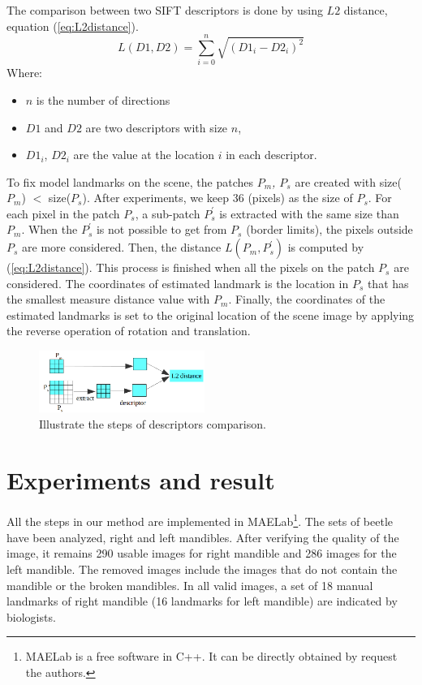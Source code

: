 \documentclass[twoside,twocolumn,10pt]{article}
\begin{document}
The comparison between two SIFT descriptors is done by using $L2$ distance, equation (\ref{eq:L2distance}).
\begin{equation}
\label{eq:L2distance}
	L(D1,D2) = \sum\limits_{i = 0}^{n}\sqrt{(D1_i-D2_i)^2}
\end{equation}
Where:
\begin{itemize}
	\item $n$ is the number of directions
	\item $D1$ and $D2$ are two descriptors with size $n$,
	\item  $D1_i$, $D2_i $ are the value at the location $i$ in each descriptor.
\end{itemize}
To fix model landmarks on the scene, the patches \textit{$P_m$, $P_s$} are created with size($P_m$) $<$ size($P_s$). After experiments, we keep 36 (pixels) as the size of \textit{$P_s$}. For each pixel in the patch \textit{$P_s$}, a sub-patch \textit{$P^{'}_s$} is extracted with the same size than \textit{$P_m$}. When the \textit{$P^{'}_s$} is not possible to get from \textit{$P_s$} (border limits), the pixels outside \textit{$P_s$} are more considered. Then, the distance \textit{$L(P_m,P^{'}_s)$} is computed by (\ref{eq:L2distance}). This process is finished when all the pixels on the patch \textit{$P_s$} are considered. The coordinates of estimated landmark is the location in \textit{$P_s$} that has the smallest measure distance value with \textit{$P_m$}. Finally, the coordinates of the estimated landmarks is set to the original location of the scene image by applying the reverse operation of rotation and translation.
\begin{figure}[htb]
    \centering
    \includegraphics[width=0.48\textwidth]{./images/illustration_SIFT}
    \caption{Illustrate the steps of descriptors comparison.}
    \label{fig:Illustrate}
\end{figure}
\section{Experiments and result}
All the steps in our method are implemented in MAELab\footnote{MAELab
  is a free software in C++. It can be directly obtained by request
  the authors.}. The sets of beetle have been analyzed, right and left
mandibles. After verifying the quality of the image, it remains 290
usable images for right mandible and 286 images for the left mandible. The
removed images include the images that do not contain the mandible or
the broken mandibles. In all valid images, a set of 18 manual landmarks of right mandible (16 landmarks for left mandible) are indicated by biologists.\\
\end{document}
